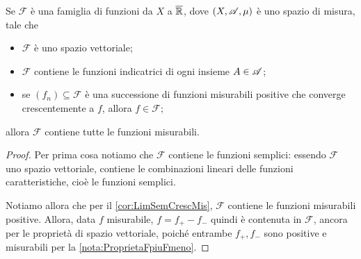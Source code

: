 \begin{theorem}\label{thm:ChiusuraMonotonaFunzioni}
	Se $\mathcal F$ è una famiglia di funzioni da $X$ a $\overline{\mathbb R}$, dove $(X,\mathscr A,\mu)$ è uno spazio di misura, tale che
	\begin{itemize}
	 \item $\mathcal F$ è uno spazio vettoriale;
	 \item $\mathcal F$ contiene le funzioni indicatrici di ogni insieme $A\in\mathscr A$;
	 \item se $(f_n)\subseteq \mathcal F$ è una successione di funzioni misurabili positive che converge crescentemente a $f$, allora $f\in \mathcal F$;
	\end{itemize}
	allora $\mathcal F$ contiene tutte le funzioni misurabili.
\end{theorem}
\begin{proof}
	Per prima cosa notiamo che $\mathcal F$ contiene le funzioni semplici: essendo $\mathcal F$ uno spazio vettoriale, contiene le combinazioni
	lineari delle funzioni caratteristiche, cioè le funzioni semplici.
	
	Notiamo allora che per il \cref{cor:LimSemCrescMis}, $\mathcal F$ contiene le funzioni misurabili positive. Allora, data $f$ misurabile,
	$f = f_+-f_-$ quindi è contenuta in $\mathcal F$, ancora per le proprietà di spazio vettoriale, poiché entrambe $f_+,f_-$ sono
	positive e misurabili per la \cref{nota:ProprietaFpiuFmeno}.
\end{proof}
